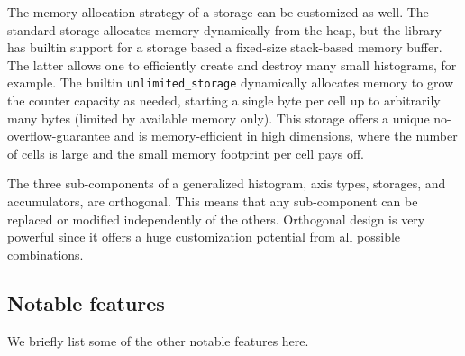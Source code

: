 \documentclass{webofc}
\begin{document}
\begin{description}
The memory allocation strategy of a storage can be customized as well. The standard storage allocates memory dynamically from the heap, but the library has builtin support for a storage based a fixed-size stack-based memory buffer. The latter allows one to efficiently create and destroy many small histograms, for example. The builtin \verb|unlimited_storage| dynamically allocates memory to grow the counter capacity as needed, starting a single byte per cell up to arbitrarily many bytes (limited by available memory only). This storage offers a unique no-overflow-guarantee and is memory-efficient in high dimensions, where the number of cells is large and the small memory footprint per cell pays off.
\end{description}

The three sub-components of a generalized histogram, axis types, storages, and accumulators, are orthogonal. This means that any sub-component can be replaced or modified independently of the others. Orthogonal design is very powerful since it offers a huge customization potential from all possible combinations.

\subsection{Notable features}
\label{sec-bh-cpp-feat}

We briefly list some of the other notable features here.
\end{document}
